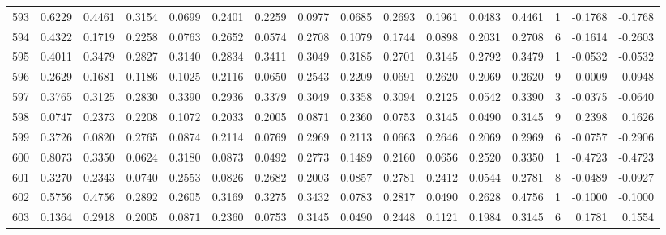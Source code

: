 \begin{tabular}{lrrrrrrrrrrrrrrr}
593 &      0.6229 &  0.4461 &  0.3154 &  0.0699 &  0.2401 &  0.2259 &  0.0977 &  0.0685 &  0.2693 &  0.1961 &   0.0483 &     0.4461 &      1 &                   -0.1768 &                    -0.1768 \\
594 &      0.4322 &  0.1719 &  0.2258 &  0.0763 &  0.2652 &  0.0574 &  0.2708 &  0.1079 &  0.1744 &  0.0898 &   0.2031 &     0.2708 &      6 &                   -0.1614 &                    -0.2603 \\
595 &      0.4011 &  0.3479 &  0.2827 &  0.3140 &  0.2834 &  0.3411 &  0.3049 &  0.3185 &  0.2701 &  0.3145 &   0.2792 &     0.3479 &      1 &                   -0.0532 &                    -0.0532 \\
596 &      0.2629 &  0.1681 &  0.1186 &  0.1025 &  0.2116 &  0.0650 &  0.2543 &  0.2209 &  0.0691 &  0.2620 &   0.2069 &     0.2620 &      9 &                   -0.0009 &                    -0.0948 \\
597 &      0.3765 &  0.3125 &  0.2830 &  0.3390 &  0.2936 &  0.3379 &  0.3049 &  0.3358 &  0.3094 &  0.2125 &   0.0542 &     0.3390 &      3 &                   -0.0375 &                    -0.0640 \\
598 &      0.0747 &  0.2373 &  0.2208 &  0.1072 &  0.2033 &  0.2005 &  0.0871 &  0.2360 &  0.0753 &  0.3145 &   0.0490 &     0.3145 &      9 &                    0.2398 &                     0.1626 \\
599 &      0.3726 &  0.0820 &  0.2765 &  0.0874 &  0.2114 &  0.0769 &  0.2969 &  0.2113 &  0.0663 &  0.2646 &   0.2069 &     0.2969 &      6 &                   -0.0757 &                    -0.2906 \\
600 &      0.8073 &  0.3350 &  0.0624 &  0.3180 &  0.0873 &  0.0492 &  0.2773 &  0.1489 &  0.2160 &  0.0656 &   0.2520 &     0.3350 &      1 &                   -0.4723 &                    -0.4723 \\
601 &      0.3270 &  0.2343 &  0.0740 &  0.2553 &  0.0826 &  0.2682 &  0.2003 &  0.0857 &  0.2781 &  0.2412 &   0.0544 &     0.2781 &      8 &                   -0.0489 &                    -0.0927 \\
602 &      0.5756 &  0.4756 &  0.2892 &  0.2605 &  0.3169 &  0.3275 &  0.3432 &  0.0783 &  0.2817 &  0.0490 &   0.2628 &     0.4756 &      1 &                   -0.1000 &                    -0.1000 \\
603 &      0.1364 &  0.2918 &  0.2005 &  0.0871 &  0.2360 &  0.0753 &  0.3145 &  0.0490 &  0.2448 &  0.1121 &   0.1984 &     0.3145 &      6 &                    0.1781 &                     0.1554 \\

\end{tabular}
